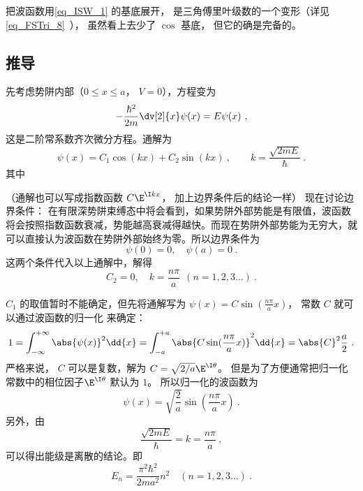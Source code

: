 把波函数用\autoref{eq_ISW_1} 的基底展开， 是三角傅里叶级数的一个变形（详见\autoref{eq_FSTri_8}~）， 虽然看上去少了 $\cos$ 基底， 但它的确是完备的。

\subsection{推导} 
先考虑势阱内部（$0 \leqslant x \leqslant a$， $V = 0$），方程变为
\begin{equation}
-\frac{\hbar^2}{2m} \dv[2]{x} \psi(x) = E\psi(x) ~,
\end{equation}
这是二阶常系数齐次微分方程。通解为
\begin{equation}
\psi(x) = C_1\cos(kx) + C_2 \sin(kx)~, \qquad
k = \frac{\sqrt{2mE}}{\hbar}~.
\end{equation} 
其中

（通解也可以写成指数函数 $C\E^{\I kx}$， 加上边界条件后的结论一样）
现在讨论边界条件： 在有限深势阱束缚态中将会看到，如果势阱外部势能是有限值，波函数将会按照指数函数衰减，势能越高衰减得越快。而现在势阱外部势能为无穷大，就可以直接认为波函数在势阱外部始终为零。所以边界条件为
\begin{equation}
\psi(0) = 0, \quad \psi(a) = 0~.
\end{equation}
这两个条件代入以上通解中，解得
\begin{equation}
C_2 = 0, \quad k = \frac{n\pi}{a}  \ \ (n = 1,2,3\dots)~.
\end{equation}

$C_1$ 的取值暂时不能确定，但先将通解写为 $\psi(x) = C\sin(\frac{n\pi }{a}x)$， 常数 $C$ 就可以通过波函数的归一化%
来确定：
\begin{equation}
1 = \int_{-\infty }^{+\infty } \abs{\psi(x)}^2 \dd{x}  = \int_{-a}^{+a} \abs{C\sin(\frac{n\pi }{a} x)}^2 \dd{x}  = \abs{C}^2 \frac{a}{2}~.
\end{equation}
严格来说， $C$ 可以是复数，解为 $C = \sqrt{2/a} \E^{\I\theta}$。 但是为了方便通常把归一化常数中的相位因子$\E^{\I\theta}$ 默认为 $1$。 所以归一化的波函数为
\begin{equation}
\psi(x) = \sqrt{\frac{2}{a}} \sin(\frac{n\pi }{a}x)~.
\end{equation}
另外，由
\begin{equation}
\frac{\sqrt{2mE}}{\hbar} = k = \frac{n\pi }{a}~,
\end{equation}
可以得出能级是离散的结论。即
\begin{equation}
E_n = \frac{\pi^2\hbar^2}{2m a^2} n^2 \quad (n = 1,2,3\dots)~.
\end{equation}
